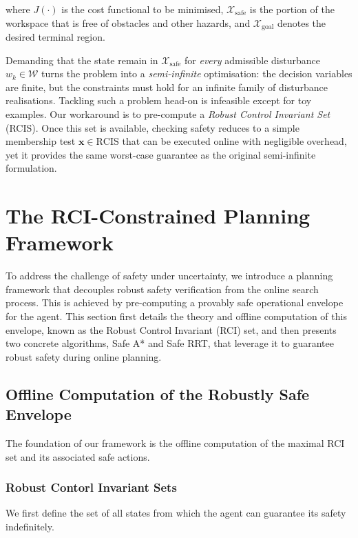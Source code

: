 \documentclass[conference]{IEEEtran}
\begin{document}
where $J(\cdot)$ is the cost functional to be minimised,
$\mathcal X_{\mathrm{safe}}$ is the portion of the workspace that is
free of obstacles and other hazards, and
$\mathcal X_{\mathrm{goal}}$ denotes the desired terminal region.

Demanding that the state remain in $\mathcal X_{\mathrm{safe}}$ for
\emph{every} admissible disturbance $w_k\!\in\!\mathcal W$ turns the
problem into a \emph{semi-infinite} optimisation: the decision variables
are finite, but the constraints must hold for an
infinite family of disturbance realisations.  Tackling such a problem
head-on is infeasible except for toy examples.  Our workaround is to
pre-compute a \emph{Robust Control Invariant Set} (RCIS).  Once this set
is available, checking safety reduces to a simple membership test
$\mathbf x\in\text{RCIS}$ that can be executed online with negligible
overhead, yet it provides the same worst-case guarantee as the original
semi-infinite formulation.

\section{The RCI-Constrained Planning Framework}
\label{sec:framework}

To address the challenge of safety under uncertainty, we introduce a planning framework that decouples robust safety verification from the online search process. This is achieved by pre-computing a provably safe operational envelope for the agent. This section first details the theory and offline computation of this envelope, known as the Robust Control Invariant (RCI) set, and then presents two concrete algorithms, Safe A* and Safe RRT, that leverage it to guarantee robust safety during online planning.

\subsection{Offline Computation of the Robustly Safe Envelope}

The foundation of our framework is the offline computation of the maximal RCI set and its associated safe actions.

\subsubsection{Robust Contorl Invariant Sets}
We first define the set of all states from which the agent can guarantee its safety indefinitely.
\end{document}
